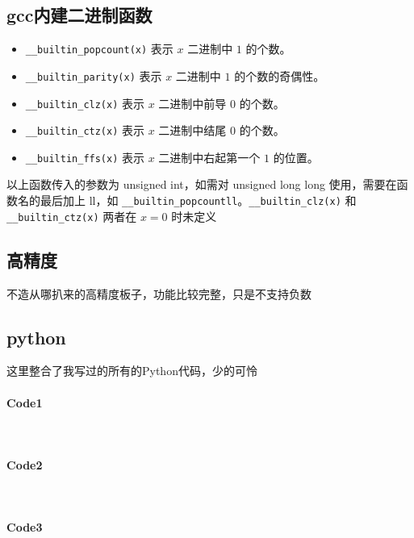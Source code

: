	\subsection{gcc内建二进制函数}
	\begin{itemize}
		\item \lstinline|__builtin_popcount(x)| 表示 $x$ 二进制中 $1$ 的个数。
		\item \lstinline|__builtin_parity(x)| 表示 $x$ 二进制中 $1$ 的个数的奇偶性。
		\item \lstinline|__builtin_clz(x)| 表示 $x$ 二进制中前导 $0$ 的个数。
		\item \lstinline|__builtin_ctz(x)| 表示 $x$ 二进制中结尾 $0$ 的个数。
		\item \lstinline|__builtin_ffs(x)| 表示 $x$ 二进制中右起第一个 $1$ 的位置。
	\end{itemize}
	以上函数传入的参数为 unsigned int，如需对 unsigned long long 使用，需要在函数名的最后加上 ll，如 \lstinline|__builtin_popcountll|。\lstinline|__builtin_clz(x)| 和 \lstinline|__builtin_ctz(x)| 两者在 $x=0$ 时未定义
	\newpage
	\subsection{高精度}
	不造从哪扒来的高精度板子，功能比较完整，只是不支持负数\\
	
	\newpage
	\subsection{python}
	这里整合了我写过的所有的Python代码，少的可怜
	\paragraph{Code1}~\\
	
	\newpage
	\paragraph{Code2}~\\
	
	\newpage
	\paragraph{Code3}~\\
	
%	
%